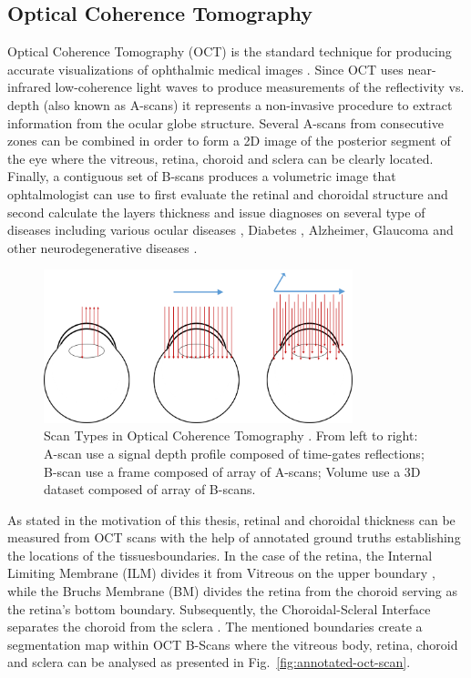 \documentclass[12pt,a4paper]{scrartcl}
\begin{document}
\subsection{Optical Coherence Tomography}
Optical Coherence Tomography (OCT) is the standard technique for producing accurate visualizations of ophthalmic medical images \cite{Garrido2014}. Since OCT uses near-infrared low-coherence light waves to produce measurements of the reflectivity vs. depth (also known as A-scans\cite{Garrido2014}) it represents a non-invasive procedure to extract information from the ocular globe structure. Several A-scans from consecutive zones can be combined in order to form a 2D image of the posterior segment of the eye where the vitreous, retina, choroid and sclera can be clearly located. Finally, a contiguous set of B-scans produces a volumetric image that ophtalmologist can use to first evaluate the retinal and choroidal structure and second calculate the layers thickness and issue diagnoses on several type of diseases including various ocular diseases \cite{Ronchetti2019}, Diabetes \cite{Jiang2018}, Alzheimer, Glaucoma and other neurodegenerative diseases \cite{DENHAAN2017162}.   


\begin{figure}[H]
    \centering
    \includegraphics[width=0.8\textwidth]{./images/csm_ABC_scans.png}
    \caption{Scan Types in Optical Coherence Tomography \cite{Willdeman2016}. From left to right: A-scan use a signal depth profile composed of time-gates reflections; B-scan use a frame composed of array of A-scans; Volume use a 3D dataset composed of array of B-scans.}
    \label{fig:mb-oct-abcscans}
\end{figure}

As stated in the motivation of this thesis, retinal and choroidal thickness can be measured from OCT scans with the help of annotated ground truths establishing the locations of the tissues\textquotesingle boundaries. In the case of the retina, the Internal Limiting Membrane (ILM) divides it from Vitreous on the upper boundary \cite{MACNAIR2015343}, while the Bruchs Membrane (BM) divides the retina from the choroid \cite{BOOIJ20101} serving as the retina's bottom boundary. Subsequently, the Choroidal-Scleral Interface separates the choroid from the sclera \cite{Ronchetti2018}. The mentioned boundaries create a segmentation map within OCT B-Scans where the vitreous body, retina, choroid and sclera can be analysed as presented in Fig.~\ref{fig:annotated-oct-scan}. 
\end{document}
